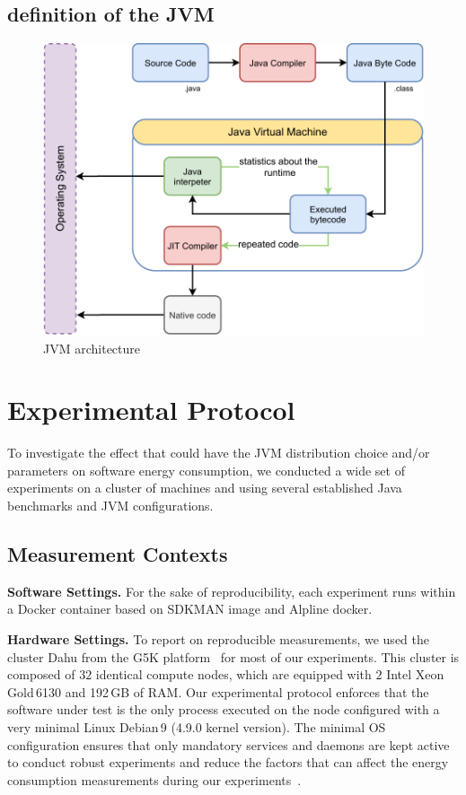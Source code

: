 \subsection{definition of the JVM}
\begin{figure}%
    \centering
    \includegraphics[width=\linewidth]{imgs/Jvm_architecture}
    \caption{JVM architecture}
    \label{fig:hotspot}
\end{figure}

\section{Experimental Protocol}\label{sec:javaprotocol}
To investigate the effect that could have the JVM distribution choice and/or parameters on software energy consumption, we conducted a wide set of experiments on a cluster of machines and using several established Java benchmarks and JVM configurations.

\subsection{Measurement Contexts}

\noindent\textbf{Software Settings.}
For the sake of reproducibility, each experiment runs within a Docker container based on SDKMAN image and Alpline docker.

\vspace{6pt}
\noindent\textbf{Hardware Settings.}
To report on reproducible measurements, we used the cluster \textsf{Dahu} from the G5K platform~\cite{grid5000} for most of our experiments.
This cluster is composed of $32$ identical compute nodes, which are equipped with $2$ Intel Xeon\,Gold\,6130 and 192\,GB of RAM.
Our experimental protocol enforces that the software under test is the only process executed on the node configured with a very minimal Linux Debian\,9 (4.9.0 kernel version).
The minimal OS configuration ensures that only mandatory services and daemons are kept active to conduct robust experiments and reduce the factors that can affect the energy consumption measurements during our experiments~\cite{opaper}.

